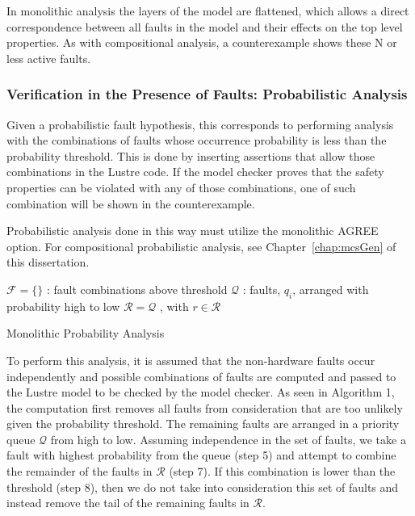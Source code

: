 In monolithic analysis the layers of the model are flattened, which allows a direct correspondence between all faults in the model and their effects on the top level properties. As with compositional analysis, a counterexample shows these N or less active faults. 

\subsubsection{Verification in the Presence of Faults: Probabilistic Analysis} 
Given a probabilistic fault hypothesis, this corresponds to performing analysis with the combinations of faults whose occurrence probability is less than the probability threshold. This is done by inserting assertions that allow those combinations in the Lustre code. If the model checker proves that the safety properties can be violated with any of those combinations, one of such combination will be shown in the counterexample. 

Probabilistic analysis done in this way must utilize the monolithic AGREE option. For compositional probabilistic analysis, see Chapter~\ref{chap:mcsGen} of this dissertation.

\begin{algorithm}[H]
	$\mathcal{F} = \{\}$ : fault combinations above threshold \;
	$\mathcal{Q}$ : faults, $q_i$, arranged with probability high to low \;
	$\mathcal{R} = \mathcal{Q}$ , with $r \in \mathcal{R}$\;
	\caption{Monolithic Probability Analysis}
	\label{alg:prob_monolithic}
\end{algorithm}

To perform this analysis, it is assumed that the non-hardware faults occur independently and possible combinations of faults are computed and passed to the Lustre model to be checked by the model checker. As seen in Algorithm 1, the computation first removes all faults from consideration that are too unlikely given the probability threshold. The remaining faults are arranged in a priority queue $\mathcal{Q}$ from high to low. Assuming independence in the set of faults, we take a fault with highest probability from the queue (step 5) and attempt to combine the remainder of the faults in $\mathcal{R}$ (step 7). If this combination is lower than the threshold (step 8), then we do not take into consideration this set of faults and instead remove the tail of the remaining faults in $\mathcal{R}$. 
 
